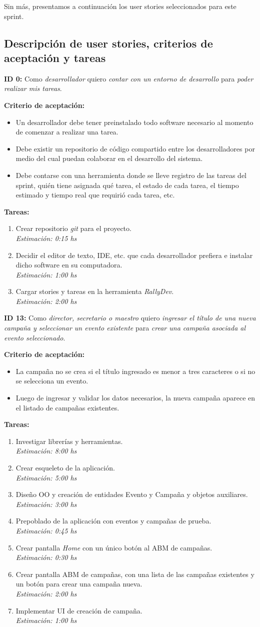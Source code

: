 \documentclass[a4paper, 10pt, twoside]{article}
\newcommand{\sprintstory}[4]{
  \noindent
  \textbf{ID #1:} Como \emph{#2} quiero \emph{#3} para \emph{#4}.
}
\newenvironment{criterios}{
  \textbf{Criterio de aceptación:}
  \begin{itemize}
}{
  \end{itemize}
}
\newcommand{\criterio}[1] {
  \item #1
}
\newenvironment{tasks}{
  \textbf{Tareas:}
  \begin{enumerate}
}{
  \end{enumerate}
}
\newcommand{\task}[2] {
  \item #1.\\
  \emph{Estimación: #2 hs}
}
\begin{document}
Sin más, presentamos a continuación los user stories seleccionados para este sprint.


\subsection{Descripción de user stories, criterios de aceptación y tareas}

\sprintstory{0}
            {desarrollador}
            {contar con un entorno de desarrollo}
            {poder realizar mis tareas}

\begin{criterios}
  \criterio{Un desarrollador debe tener preinstalado todo software necesario al momento de comenzar a realizar una tarea.}
  \criterio{Debe existir un repositorio de código compartido entre los desarrolladores por medio del cual puedan colaborar en el desarrollo del sistema.}
  \criterio{Debe contarse con una herramienta donde se lleve registro de las tareas del sprint, quién tiene asignada qué tarea, el estado de cada tarea, el tiempo estimado y tiempo real que requirió cada tarea, etc.}
\end{criterios}

\begin{tasks}
  \task{Crear repositorio \textit{git} para el proyecto}{0:15}
  \task{Decidir el editor de texto, IDE, etc. que cada desarrollador prefiera e instalar dicho software en su computadora}{1:00}
  \task{Cargar stories y tareas en la herramienta \textit{RallyDev}}{2:00}
\end{tasks}


\sprintstory{13}
            {director, secretario o maestro}
            {ingresar el título de una nueva campaña y seleccionar un evento existente}
            {crear una campaña asociada al evento seleccionado}

\begin{criterios}
  \criterio{La campaña no se crea si el título ingresado es menor a tres caracteres o si no se selecciona un evento.}
  \criterio{Luego de ingresar y validar los datos necesarios, la nueva campaña aparece en el listado de campañas existentes.}
\end{criterios}

\begin{tasks}
  \task{Investigar librerías y herramientas}{8:00}
  \task{Crear esqueleto de la aplicación}{5:00}
  \task{Diseño OO y creación de entidades Evento y Campaña y objetos auxiliares}{3:00}
  \task{Prepoblado de la aplicación con eventos y campañas de prueba}{0:45}
  \task{Crear pantalla \emph{Home} con un único botón al ABM de campañas}{0:30}
  \task{Crear pantalla ABM de campañas, con una lista de las campañas existentes y un botón para crear una campaña nueva}{2:00}
  \task{Implementar UI de creación de campaña}{1:00}
\end{tasks}
\end{document}
